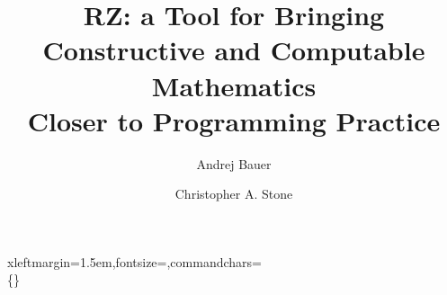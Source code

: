 \pagestyle{plain}

\usepackage{amsmath}
\usepackage{amssymb}
\usepackage{graphicx}
\usepackage{mathpartir}
\usepackage{fancyvrb}
\usepackage{url}
\usepackage{ifpdf}

\ifpdf
\usepackage{pdfsync}
\fi




%

\newcommand{\sourcefile}[1]{%
\VerbatimInput[xleftmargin=1.5em,fontsize=\footnotesize]{#1}}

\newcommand{\sourcefilex}[1]{%
\VerbatimInput[xleftmargin=1.5em,fontsize=\scriptsize]{#1}}

%
{xleftmargin=1.5em,fontsize=\footnotesize,commandchars=\\\{\}}

\newcommand{\iTo}{$\to$}
\newcommand{\iForall}{$\forall$}
\newcommand{\iOr}{$\lor$}
\newcommand{\iAnd}{$\land$}
\newcommand{\iImply}{$\Rightarrow$}
\newcommand{\iNot}{$\lnot$}
\newcommand{\iExists}{$\exists$}
\newcommand{\iExistsOne}{$\exists!$}
\newcommand{\iT}[1]{$\|$#1$\|$}
\newcommand{\iPer}[1]{$\approx_{\mathtt{#1}}$}
\newcommand{\iIff}{$\Leftrightarrow$}
\newcommand{\iLeq}{$\leq$}
\newcommand{\iRz}{$\rz$}



\title{RZ: a Tool for Bringing\\
  Constructive and Computable Mathematics\\
  Closer to Programming Practice}
\author{
  Andrej Bauer \and
  Christopher A. Stone}

\maketitle

